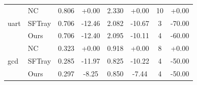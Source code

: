\begin{table}[t]
{\begin{tabular}{llcccccc}
\midrule
\multirow{3}{*}{uart} & NC & 0.806 & +0.00 & 2.330 & +0.00 & 10 & +0.00 \\
 & SFTray & 0.706 & -12.46 & 2.082 & -10.67 & 3 & -70.00 \\
 & Ours & 0.706 & -12.40 & 2.095 & -10.11 & 4 & -60.00 \\
\midrule
\multirow{3}{*}{gcd} & NC & 0.323 & +0.00 & 0.918 & +0.00 & 8 & +0.00 \\
 & SFTray & 0.285 & -11.97 & 0.825 & -10.22 & 4 & -50.00 \\
 & Ours & 0.297 & -8.25 & 0.850 & -7.44 & 4 & -50.00 \\
\midrule
\bottomrule
\end{tabular}
}
\end{table}